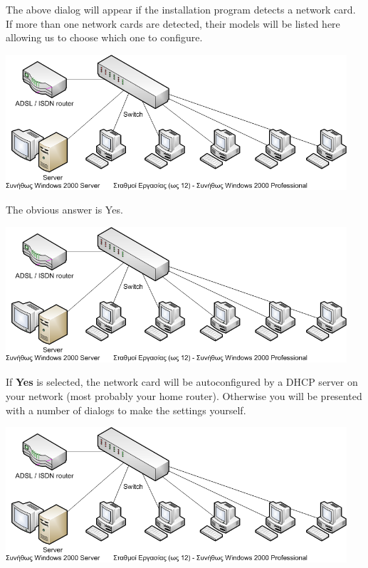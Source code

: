 \documentclass[a4paper,twoside,12pt]{article}
\begin{document}
The above dialog will appear if the installation program detects a network card. If more than one network cards are detected, their models will be listed here allowing us to choose which one to configure.

\begin{center}
\includegraphics[width=0.95\textwidth]{images/main/school-lab}
\end{center}

The obvious answer is Yes.

\begin{center}
\includegraphics[width=0.95\textwidth]{images/main/school-lab}
\end{center}

If \textbf{Yes} is selected, the network card will be autoconfigured by a DHCP server on your network (most probably your home router). Otherwise you will be presented with a number of dialogs to make the settings yourself.

\begin{center}
\includegraphics[width=0.95\textwidth]{images/main/school-lab}
\end{center}
\end{document}
